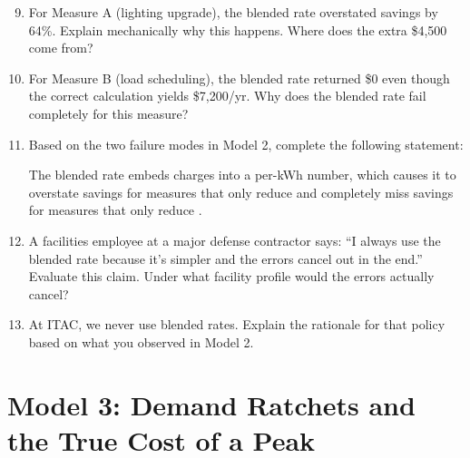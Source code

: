 \documentclass[./main.tex]{subfiles}
\begin{document}
\begin{enumerate}
  \setcounter{enumi}{8}
  \item For Measure A (lighting upgrade), the blended rate overstated savings
        by 64\%. Explain mechanically why this happens. Where does the extra
        \$4,500 come from?
        \vspace{1.25in}

  \item For Measure B (load scheduling), the blended rate returned \$0 even
        though the correct calculation yields \$7,200/yr. Why does the blended
        rate fail completely for this measure?
        \vspace{1.25in}

  \item Based on the two failure modes in Model 2, complete the following
        statement:

        \vspace{0.25in}
      The blended rate embeds \underline{\hspace{4cm}} charges into a
      per-kWh number, which causes it to overstate savings for measures that
      only reduce \underline{\hspace{4cm}} and completely miss savings for
      measures that only reduce \underline{\hspace{4cm}}.
      \vspace{0.25in}


  \item A facilities employee at a major defense contractor says: ``I always
        use the blended rate because it's simpler and the errors cancel out in
        the end.'' Evaluate this claim. Under what facility profile would the
        errors actually cancel?
        \vspace{1.25in}

  \item At ITAC, we never use blended rates. Explain the rationale for that
        policy based on what you observed in Model 2.
        \vspace{1.25in}
\end{enumerate}

\clearpage
\section*{Model 3: Demand Ratchets and the True Cost of a Peak}
\end{document}
